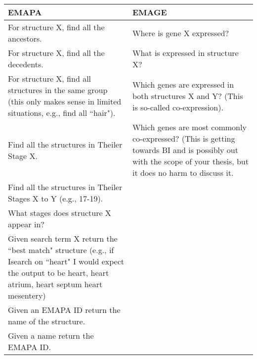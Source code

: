 \begin{center}
    \begin{tabular}{ | p{0.5\linewidth} | p{0.5\linewidth}|}
    \hline
    \textbf{EMAPA} & \textbf{EMAGE} \\ \hline
    For structure X, find all the ancestors. &  Where is gene X expressed? \\ \hline
    For structure X, find all the decedents. &  What is expressed in structure X? \\ \hline
    For structure X, find all structures in the same group (this only makes sense in limited situations, e.g., find all ``hair"). & Which genes are expressed in both structures X and Y?  (This is so-called co-expression). \\ \hline
    Find all the structures in Theiler Stage X. & Which genes are most commonly co-expressed? (This is getting towards BI and is possibly out with the scope of your thesis, but it does no harm to discuss it. \\ \hline
    Find all the structures in Theiler Stages X to Y (e.g., 17-19). &  \\ \hline
    What stages does structure X appear in? & \\ \hline
    Given search term X return the ``best match" structure (e.g., if Isearch on ``heart" I would expect the output to be heart, heart atrium, heart septum  heart mesentery) & \\ \hline
    Given an EMAPA ID return the name of the structure. &  \\ \hline
    Given a name return the EMAPA ID. &  \\ \hline
    \end{tabular}
\end{center}






